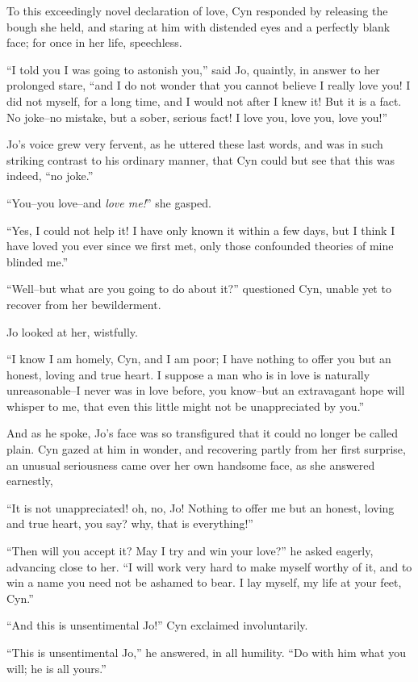 To this exceedingly novel declaration of love, Cyn responded by
releasing the bough she held, and staring at him with distended eyes and
a perfectly blank face; for once in her life, speechless.

``I told you I was going to astonish you,'' said Jo, quaintly, in answer
to her prolonged stare, ``and I do not wonder that you cannot believe I
really love you! I did not myself, for a long time, and I would not
after I knew it! But it is a fact. No joke--no mistake, but a sober,
serious fact! I love you, love you, love you!''

Jo's voice grew very fervent, as he uttered these last words, and was in
such striking contrast to his ordinary manner, that Cyn could but see
that this was indeed, ``no joke.''

``You--you love--and \emph{love me!}'' she gasped.

``Yes, I could not help it! I have only known it within a few days, but I
think I have loved you ever since we first met, only those confounded
theories of mine blinded me.''

``Well--but what are you going to do about it?'' questioned Cyn, unable
yet to recover from her bewilderment.

Jo looked at her, wistfully.

``I know I am homely, Cyn, and I am poor; I have nothing to offer you but
an honest, loving and true heart. I suppose a man who is in love is
naturally unreasonable--I never was in love before, you know--but an
extravagant hope will whisper to me, that even this little might not be
unappreciated by you.''

And as he spoke, Jo's face was so transfigured that it could no longer
be called plain. Cyn gazed at him in wonder, and recovering partly from
her first surprise, an unusual seriousness came over her own handsome
face, as she answered earnestly,

``It is not unappreciated! oh, no, Jo! Nothing to offer me but an honest,
loving and true heart, you say? why, that is everything!''

``Then will you accept it? May I try and win your love?'' he asked
eagerly, advancing close to her. ``I will work very hard to make myself
worthy of it, and to win a name you need not be ashamed to bear. I lay
myself, my life at your feet, Cyn.''

``And this is unsentimental Jo!'' Cyn exclaimed involuntarily.

``This is unsentimental Jo,'' he answered, in all humility. ``Do with him
what you will; he is all yours.''

